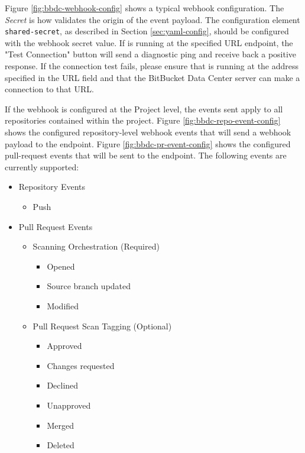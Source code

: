Figure \ref{fig:bbdc-webhook-config} shows a typical webhook configuration.  The \textit{Secret} is how \cxoneflow
validates the origin of the event payload.  The configuration element \texttt{shared-secret}, as described
in Section \ref{sec:yaml-config}, should be configured with the webhook secret value.  If \cxoneflow
is running at the specified URL endpoint, the "Test Connection" button will send a diagnostic ping
and receive back a positive response.  If the connection test fails, please ensure that \cxoneflow is running
at the address specified in the URL field and that the BitBucket Data Center server can make a connection
to that URL.

If the webhook is configured at the Project level, the events sent apply to all repositories contained
within the project.  Figure \ref{fig:bbdc-repo-event-config} shows the configured repository-level webhook 
events that will send a webhook payload to the \cxoneflow endpoint. 
Figure \ref{fig:bbdc-pr-event-config} shows the configured pull-request events that will be sent to 
the \cxoneflow endpoint.  The following events are currently supported:


\pagebreak
\begin{itemize}
    \item Repository Events
        \begin{itemize}
            \item Push
        \end{itemize}
    \item Pull Request Events
        \begin{itemize}
            \item Scanning Orchestration (Required)
                \begin{itemize}
                    \item Opened
                    \item Source branch updated
                    \item Modified
                \end{itemize}
        \end{itemize}
        \begin{itemize}
            \item Pull Request Scan Tagging (Optional)
                \begin{itemize}
                    \item Approved
                    \item Changes requested
                    \item Declined
                    \item Unapproved
                    \item Merged
                    \item Deleted
                \end{itemize}
        \end{itemize}

\end{itemize}


